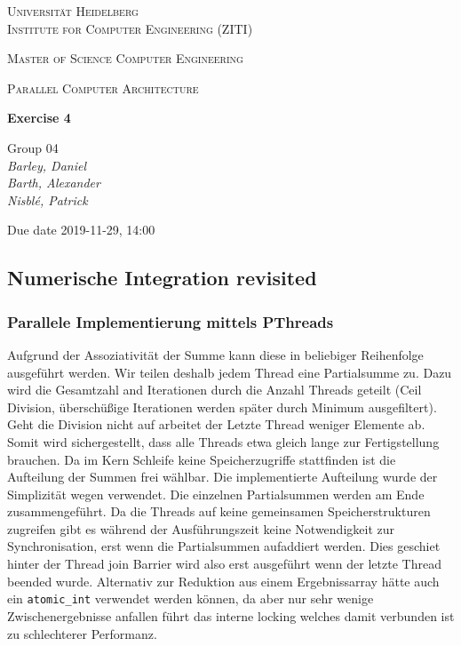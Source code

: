 \documentclass[12pt]{article}
\newcommand{\lecture}{Parallel Computer Architecture}
\newcommand{\exercise}{Exercise 4}
\newcommand{\groupnumber}{Group 04}
\newcommand{\groupmemberslist}{Barley, Daniel\\Barth, Alexander\\Nisblé, Patrick}
\newcommand{\duedate}{2019-11-29, 14:00}
\begin{document}
	\begin{titlepage}
		\centering
		
		{\scshape\LARGE Universität Heidelberg\\Institute for Computer Engineering (ZITI) \par}
		\vspace{1.5cm}
		{\scshape\Large Master of Science Computer Engineering \par}
		\vspace{0.5cm}
		{\scshape\Large \lecture \par}
		\vspace{1.5cm}
		{\huge\bfseries \exercise \par}
		\vspace{2cm}
		{\Large \groupnumber \itshape  \\ \groupmemberslist \par}
		\vfill
		
		
		{\large Due date \duedate \par}
	\end{titlepage}

\setcounter{section}{4}
\subsection{Numerische Integration revisited}

\subsubsection{Parallele Implementierung mittels PThreads}

Aufgrund der Assoziativität der Summe kann diese in beliebiger Reihenfolge ausgeführt werden.
Wir teilen deshalb jedem Thread eine Partialsumme zu.
Dazu wird die Gesamtzahl and Iterationen durch die Anzahl Threads geteilt (Ceil Division, überschüßige Iterationen werden später durch Minimum ausgefiltert).
Geht die Division nicht auf arbeitet der Letzte Thread weniger Elemente ab.
Somit wird sichergestellt, dass alle Threads etwa gleich lange zur Fertigstellung brauchen.
Da im Kern Schleife keine Speicherzugriffe stattfinden ist die Aufteilung der Summen frei wählbar.
Die implementierte Aufteilung wurde der Simplizität wegen verwendet.
Die einzelnen Partialsummen werden am Ende zusammengeführt.
Da die Threads auf keine gemeinsamen Speicherstrukturen zugreifen gibt es während der Ausführungszeit keine
Notwendigkeit zur Synchronisation, erst wenn die Partialsummen aufaddiert werden.
Dies geschiet hinter der Thread join Barrier wird also erst ausgeführt wenn der letzte Thread beended wurde.
Alternativ zur Reduktion aus einem Ergebnissarray hätte auch ein \texttt{atomic\_int} verwendet werden können,
da aber nur sehr wenige Zwischenergebnisse anfallen führt das interne locking welches damit verbunden ist zu 
schlechterer Performanz.
\end{document}
